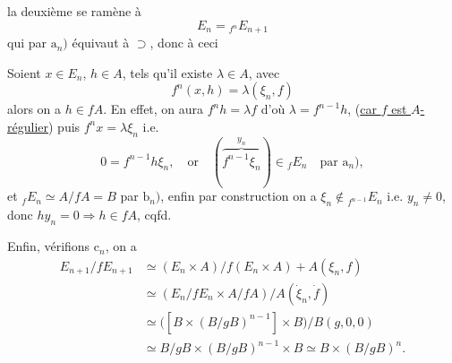 la deuxième  se ramène à
\[
E_n={}_{f^n}E_{n+1}
\]
qui par $\mathrm a_n)$ équivaut à $\supset$, donc à ceci

Soient $x\in E_n$, $h\in A$,  tels qu'il existe $\lambda\in A$, avec
\[
f^n(x,h)=\lambda(\xi_n,f)
\]
alors on a $h\in fA$. En effet, on aura $f^nh=\lambda f$ d'où $\lambda=f^{n-1}h$, (\uline{car $f$ est $A$-régulier}) puis $f^nx=\lambda\xi_n$  i.e.
\[
0=f^{n-1}h\xi_n,\quad\text{or}\quad (\overbrace{f^{n-1}\xi_n}^{y_n})\in {}_fE_n\quad\text{par }\mathrm a_n),
\]
 et $ {}_fE_n\simeq A/fA=B$ par $\mathrm b_n)$,  enfin par construction on a $\xi_n\notin{}_{f^{n-1}}E_n$ i.e.  $y_n\neq0$, donc $hy_n=0\Longrightarrow h\in fA$, cqfd.

Enfin, vérifions $\mathrm c_n$, on a
\[
\begin{aligned}
E_{n+1}/fE_{n+1}&\simeq(E_n\times A)/f(E_n\times A)+A(\xi_n,f)\\
&\simeq(E_n/fE_n\times A/fA)/A(\dot{\xi}_n,\dot f)\\
&\simeq\bigl([B\times(B/gB)^{n-1}]\times B\bigr)/B(g,0,0)\\
&\simeq B/gB\times(B/gB)^{n-1}\times B\simeq B\times(B/gB)^n.
\end{aligned}
\]

